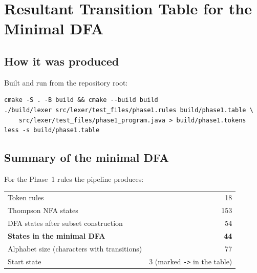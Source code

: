 \documentclass[11pt,a4paper]{article}
\begin{document}
\section{Resultant Transition Table for the Minimal DFA}

\subsection{How it was produced}
Built and run from the repository root:
\begin{lstlisting}[basicstyle=\ttfamily\small]
cmake -S . -B build && cmake --build build
./build/lexer src/lexer/test_files/phase1.rules build/phase1.table \
    src/lexer/test_files/phase1_program.java > build/phase1.tokens
less -s build/phase1.table
\end{lstlisting}

\subsection{Summary of the minimal DFA}
For the Phase~1 rules the pipeline produces:
\begin{center}
\begin{tabular}{lr}
\toprule
Token rules & 18 \\
Thompson NFA states & 153 \\
DFA states after subset construction & 54 \\
\textbf{States in the minimal DFA} & \textbf{44} \\
Alphabet size (characters with transitions) & 77 \\
Start state & 3 (marked \texttt{->} in the table) \\
\bottomrule
\end{tabular}
\end{center}
\end{document}
